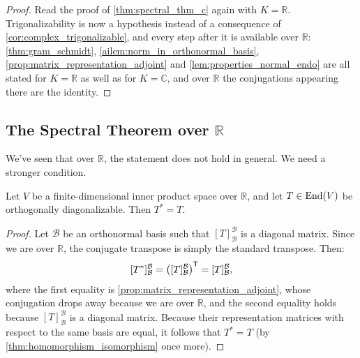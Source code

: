 \begin{proof}
Read the proof of \cref{thm:spectral_thm_c} again with $K = \mathbb{R}$. Trigonalizability is now a hypothesis instead of a consequence of \cref{cor:complex_trigonalizable}, and every step after it is available over $\mathbb{R}$: \cref{thm:gram_schmidt}, \cref{ailem:norm_in_orthonormal_basis}, \cref{prop:matrix_representation_adjoint} and \cref{lem:properties_normal_endo} are all stated for $K = \mathbb{R}$ as well as for $K = \mathbb{C}$, and over $\mathbb{R}$ the conjugations appearing there are the identity.
\end{proof}

\subsection{The Spectral Theorem over \texorpdfstring{$\mathbb{R}$}{R}}

We've seen that over $\mathbb{R}$, the statement  does not hold in general. We need a stronger condition.

\begin{lemma}
\label{lem:real_orth_diag_is_self_adj}
Let $V$ be a finite-di\-men\-sional inner product space over $\mathbb{R}$, and let $T \in \operatorname{End}(V)$ be orthogonally diagonalizable. Then $T^* = T$.
\end{lemma}

\begin{proof}
Let $\mathcal{B}$ be an orthonormal basis such that $[T]_{\mathcal{B}}^{\mathcal{B}}$ is a diagonal matrix. Since we are over $\mathbb{R}$, the conjugate transpose is simply the standard transpose. Then:
\[
    [T^*]_{\mathcal{B}}^{\mathcal{B}} = \left([T]_{\mathcal{B}}^{\mathcal{B}}\right)^{\mathsf{T}} = [T]_{\mathcal{B}}^{\mathcal{B}},
\]
where the first equality is \cref{prop:matrix_representation_adjoint}, whose conjugation drops away because we are over $\mathbb{R}$, and the second equality holds because $[T]_{\mathcal{B}}^{\mathcal{B}}$ is a diagonal matrix. Because their representation matrices with respect to the same basis are equal, it follows that $T^* = T$ (by \cref{thm:homomorphism_isomorphism} once more).
\end{proof}

